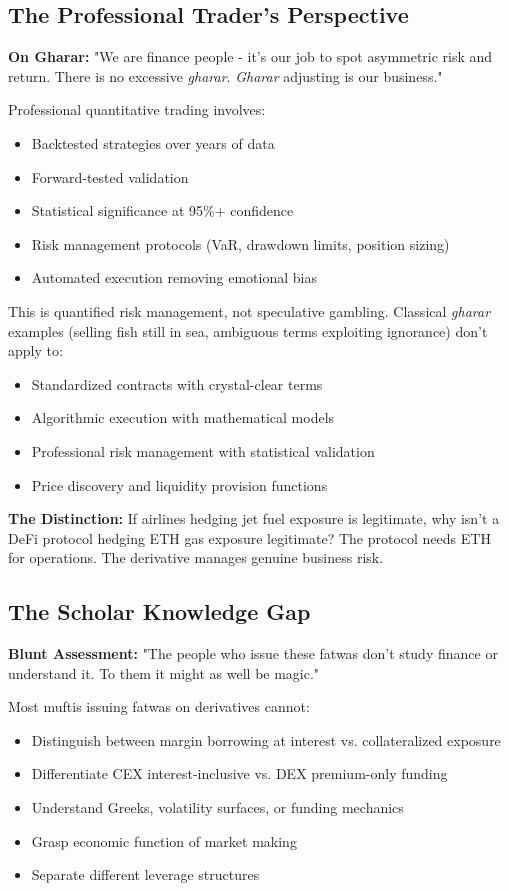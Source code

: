 \documentclass[10pt,twocolumn]{article}
\begin{document}
\subsection{The Professional Trader's Perspective}

\textbf{On Gharar:} "We are finance people - it's our job to spot asymmetric risk and return. There is no excessive \textit{gharar}. \textit{Gharar} adjusting is our business."

Professional quantitative trading involves:
\begin{itemize}
    \item Backtested strategies over years of data
    \item Forward-tested validation
    \item Statistical significance at 95\%+ confidence
    \item Risk management protocols (VaR, drawdown limits, position sizing)
    \item Automated execution removing emotional bias
\end{itemize}

This is quantified risk management, not speculative gambling. Classical \textit{gharar} examples (selling fish still in sea, ambiguous terms exploiting ignorance) don't apply to:
\begin{itemize}
    \item Standardized contracts with crystal-clear terms
    \item Algorithmic execution with mathematical models
    \item Professional risk management with statistical validation
    \item Price discovery and liquidity provision functions
\end{itemize}

\textbf{The Distinction:} If airlines hedging jet fuel exposure is legitimate, why isn't a DeFi protocol hedging ETH gas exposure legitimate? The protocol needs ETH for operations. The derivative manages genuine business risk.

\subsection{The Scholar Knowledge Gap}

\textbf{Blunt Assessment:} "The people who issue these fatwas don't study finance or understand it. To them it might as well be magic."

Most muftis issuing fatwas on derivatives cannot:
\begin{itemize}
    \item Distinguish between margin borrowing at interest vs. collateralized exposure
    \item Differentiate CEX interest-inclusive vs. DEX premium-only funding
    \item Understand Greeks, volatility surfaces, or funding mechanics
    \item Grasp economic function of market making
    \item Separate different leverage structures
\end{itemize}
\end{document}
